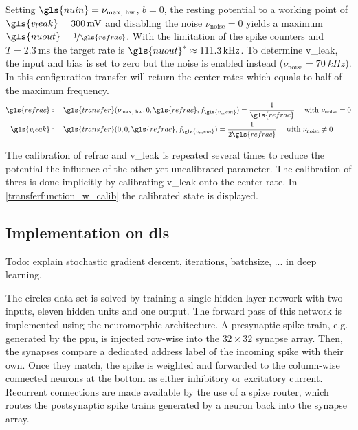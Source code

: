 Setting $\gls{nuin} = \nu_\text{max, hw}$, $b=0$, the resting potential to a working point of $\gls{v_leak} = \SI{300}{\milli \V}$ and disabling the noise $\nu_\text{noise} = 0$ yields a maximum $\gls{nuout} = \nicefrac{1}{\gls{refrac}}$. With the limitation of the spike counters and $T = \SI{2.3}{\milli \s} $ the target rate is $\gls{nuout}^* \approx \SI{111.3}{\kilo \Hz}$. To determine \gls{v_leak}, the input and bias is set to zero but the noise is enabled instead ($\nu_\text{noise} = \SI{70}{kHz}$). In this configuration \gls{transfer} will return the center rates which equals to half of the maximum frequency.
\begin{align*}\label{calibration_config}
\gls{refrac}&:\quad \gls{transfer}(\nu_\text{max, hw}, 0, \gls{refrac}, f_{\gls{v_mem}}) = \frac{1}{\gls{refrac}} \quad \text{ with } \nu_\text{noise} = 0\\
\gls{v_leak}&:\quad \gls{transfer}(0, 0, \gls{refrac}, f_{\gls{v_mem}}) = \frac{1}{2\gls{refrac}} \quad \text{ with } \nu_\text{noise} \neq 0
\end{align*}

The calibration of \gls{refrac} and \gls{v_leak} is repeated several times to reduce the potential the influence of the other yet uncalibrated parameter. The calibration of \gls{thres} is done implicitly by calibrating \gls{v_leak} onto the center rate. In \cref{transferfunction_w_calib} the calibrated state is displayed. 

\subsection{Implementation on \gls{dls}}

Todo: explain stochastic gradient descent, iterations, batchsize, ... in deep learning.


The circles data set is solved by training a single hidden layer network with two inputs, eleven hidden units and one output.
The forward pass of this network is implemented using the neuromorphic architecture. A presynaptic spike train, e.g. generated by the \gls{ppu}, is injected row-wise into the $32\times32$ synapse array. Then, the synapses compare a dedicated address label of the incoming spike with their own. Once they match, the spike is weighted and forwarded to the column-wise connected neurons at the bottom as either inhibitory or excitatory current. Recurrent connections are made available by the use of a spike router, which routes the postsynaptic spike trains generated by a neuron back into the synapse array.


